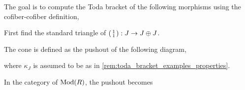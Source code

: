 \begin{example}
	The goal is to compute the Toda bracket of the following morphisms using the cofiber-cofiber definition,
	\begin{center}
	\end{center}

	First find the standard triangle of \( \begin{psmallmatrix} 1 \\ 1 \end{psmallmatrix}: J \to J \oplus J \).

	The cone is defined as the pushout of the following diagram,
	\begin{center}
	\end{center}
	where \( \kappa_J \) is assumed to be as in \autoref{rem:toda_bracket_examples_properties}.

	In the category of \( \operatorname{Mod}(R) \), the pushout becomes
	\begin{center}
\end{center}
\end{example}
